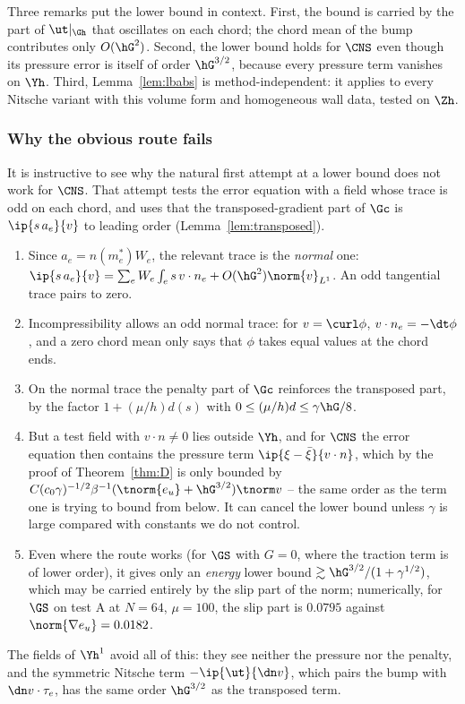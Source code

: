 Three remarks put the lower bound in context. First, the bound is carried by the part of $\ut|_{\Gh}$ that oscillates on each chord; the chord mean of the bump contributes only $O(\hG^2)$. Second, the lower bound holds for $\CNS$ even though its pressure error is itself of order $\hG^{3/2}$, because every pressure term vanishes on $\Yh$. Third, Lemma~\ref{lem:lbabs} is method-independent: it applies to every Nitsche variant with this volume form and homogeneous wall data, tested on $\Zh$.

\subsubsection*{Why the obvious route fails}
It is instructive to see why the natural first attempt at a lower bound does not work for $\CNS$. That attempt tests the error equation with a field whose trace is odd on each chord, and uses that the transposed-gradient part of $\Gc$ is $\ip{s\,a_e}{v}$ to leading order (Lemma~\ref{lem:transposed}).
\begin{enumerate}
\item Since $a_e=n(m_e^\ast)W_e$, the relevant trace is the \emph{normal} one: $\ip{s\,a_e}{v}=\sum_eW_e\int_es\,v\cdot n_e+O(\hG^2)\norm{v}_{L^1}$. An odd tangential trace pairs to zero.
\item Incompressibility allows an odd normal trace: for $v=\curl\phi$, $v\cdot n_e=-\dt\phi$, and a zero chord mean only says that $\phi$ takes equal values at the chord ends.
\item On the normal trace the penalty part of $\Gc$ reinforces the transposed part, by the factor $1+(\mu/h)d(s)$ with $0\le(\mu/h)d\le\gamma\hG/8$.
\item But a test field with $v\cdot n\ne0$ lies outside $\Yh$, and for $\CNS$ the error equation then contains the pressure term $\ip{\xi-\bar\xi}{v\cdot n}$, which by the proof of Theorem~\ref{thm:D} is only bounded by $C(c_0\gamma)^{-1/2}\beta^{-1}(\tnorm{e_u}+\hG^{3/2})\tnorm v$ -- the same order as the term one is trying to bound from below. It can cancel the lower bound unless $\gamma$ is large compared with constants we do not control.
\item Even where the route works (for $\GS$ with $G=0$, where the traction term is of lower order), it gives only an \emph{energy} lower bound $\gtrsim\hG^{3/2}/(1+\gamma^{1/2})$, which may be carried entirely by the slip part of the norm; numerically, for $\GS$ on test A at $N=64$, $\mu=100$, the slip part is $0.0795$ against $\norm{\nabla e_u}=0.0182$.
\end{enumerate}
The fields of $\Yh^1$ avoid all of this: they see neither the pressure nor the penalty, and the symmetric Nitsche term $-\ip{\ut}{\dn v}$, which pairs the bump with $\dn v\cdot\tau_e$, has the same order $\hG^{3/2}$ as the transposed term.

